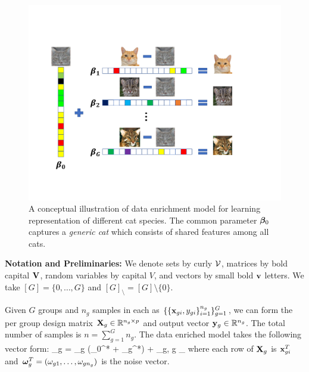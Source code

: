 \begin{figure}
		\centering
		\includegraphics[scale=.39]{./img/concept.pdf}
		\caption{A conceptual illustration of data enrichment model for learning representation of  different cat species. The common parameter $\boldsymbol{\beta}_0$ captures a \emph{generic cat} which consists of shared features among all cats.}
		\label{fig:cat}
\end{figure}



{\bf Notation and Preliminaries:}
We denote sets by curly ${\cal V}$, matrices by bold capital $\mathbf{V}$, random variables by capital $V$, and vectors by small bold $\mathbf{v}$ letters.
We take $[G] = \{0, \dots, G\}$ and $[G]_\setminus = [G] \setminus \{0\}$.

Given $G$ groups and $n_g$ samples in each as $\{ \{\mathbf{x}_{gi}, y_{gi} \}_{i=1}^{n_g} \}_{g = 1}^G$, we can form the per group design matrix $\mathbf{X}_g \in \mathbb R^{n_g \times p}$ and output vector $\mathbf{y}_g \in \mathbb R ^{n_g}$.
The total number of samples is  $n = \sum_{g = 1}^{G} n_g$.
The data enriched model takes the following vector form:
\be
\label{eq:dirtymodel}
\y_g = \X_g (\bbeta _0^* + \bbeta _g^*) + \oomega_g,  \quad \forall g \in [G]_\setminus
\ee
where each row of $\mathbf{X}_g$ is $\mathbf{x}_{gi}^T$ and $\boldsymbol{\omega}_g^T = (\omega_{g1}, \dots, \omega_{gn_g})$ is the noise vector.


